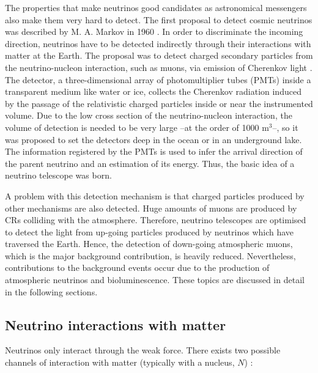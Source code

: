 The properties that make neutrinos good candidates as astronomical messengers also make them very hard to detect. The first proposal to detect cosmic neutrinos was described by M. A. Markov in 1960 \cite{astro_neutrino}. In order to discriminate the incoming direction, neutrinos have to be detected indirectly through their interactions with matter at the Earth. The proposal was to detect charged secondary particles from the neutrino-nucleon interaction, such as muons, via emission of Cherenkov light \cite{Cheren}. The detector, a three-dimensional array of photomultiplier tubes (PMTs) inside a transparent medium like water or ice, collects the Cherenkov radiation induced by the passage of the relativistic charged particles inside or near the instrumented volume. Due to the low cross section of the neutrino-nucleon interaction, the volume of detection is needed to be very large --at the order of 1000 m$^3$--, so it was proposed to set the detectors deep in the ocean or in an underground lake. The information registered by the PMTs is used to infer the arrival direction of the parent neutrino and an estimation of its energy. Thus, the basic idea of a neutrino telescope was born.

A problem with this detection mechanism is that charged particles produced by other mechanisms are also detected. Huge amounts of muons are produced by CRs colliding with the atmosphere. Therefore, neutrino telescopes are optimised to detect the light from up-going particles produced by neutrinos which have traversed the Earth. Hence, the detection of down-going atmospheric muons, which is the major background contribution, is heavily reduced. Nevertheless, contributions to the background events occur due to the production of atmospheric neutrinos and bioluminescence. These topics are discussed in detail in the following sections.

\subsection{Neutrino interactions with matter}

Neutrinos only interact through the weak force. There exists two possible channels of interaction with matter (typically with a nucleus, $N$) \cite{neutrino_interactions}: 

